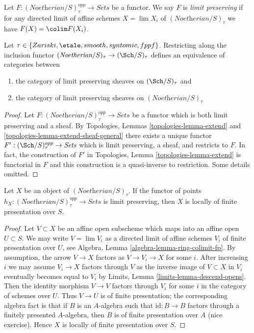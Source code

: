 \noindent
Let $F : (\textit{Noetherian}/S)_\tau^{opp} \to \textit{Sets}$
be a functor. We say $F$ is {\it limit preserving} if for any
directed limit of affine schemes $X = \lim X_i$ of
$(\textit{Noetherian}/S)_\tau$ we have $F(X) = \colim F(X_i)$.

\begin{lemma}
\label{lemma-canonical-extension}
Let $\tau \in \{Zariski, \etale, smooth, syntomic, fppf\}$.
Restricting along the inclusion functor
$(\textit{Noetherian}/S)_\tau \to (\Sch/S)_\tau$
defines an equivalence of categories between
\begin{enumerate}
\item the category of limit preserving sheaves on
$(\Sch/S)_\tau$ and
\item the category of limit preserving sheaves on
$(\textit{Noetherian}/S)_\tau$
\end{enumerate}
\end{lemma}

\begin{proof}
Let $F : (\textit{Noetherian}/S)_\tau^{opp} \to \textit{Sets}$
be a functor which is both limit preserving and a sheaf.
By Topologies, Lemmas
\ref{topologies-lemma-extend} and \ref{topologies-lemma-extend-sheaf-general}
there exists a unique functor
$F' : (\Sch/S)_\tau^{opp} \to \textit{Sets}$
which is limit preserving, a sheaf, and restricts to $F$.
In fact, the construction of $F'$ in
Topologies, Lemma \ref{topologies-lemma-extend}
is functorial in $F$ and this construction is a quasi-inverse
to restriction. Some details omitted.
\end{proof}

\begin{lemma}
\label{lemma-representable-limit-preserving}
Let $X$ be an object of $(\textit{Noetherian}/S)_\tau$. If the functor
of points $h_X : (\textit{Noetherian}/S)_\tau^{opp} \to \textit{Sets}$
is limit preserving, then $X$ is locally of finite presentation over $S$.
\end{lemma}

\begin{proof}
Let $V \subset X$ be an affine open subscheme which maps into an affine
open $U \subset S$. We may write $V = \lim V_i$ as a directed limit of affine
schemes $V_i$ of finite presentation over $U$, see
Algebra, Lemma \ref{algebra-lemma-ring-colimit-fp}.
By assumption, the arrow $V \to X$ factors as $V \to V_i \to X$
for some $i$. After increasing $i$ we may assume $V_i \to X$
factors through $V$ as the inverse image of $V \subset X$ in $V_i$
eventually becomes equal to $V_i$ by
Limits, Lemma \ref{limits-lemma-descend-opens}.
Then the identity morphism $V \to V$ factors through $V_i$ for some $i$
in the category of schemes over $U$. Thus $V \to U$ is of finite presentation;
the corresponding algebra fact is that if $B$ is an $A$-algebra
such that $\text{id} : B \to B$ factors through a finitely presented
$A$-algebra, then $B$ is of finite presentation over $A$ (nice exercise).
Hence $X$ is locally of finite presentation over $S$.
\end{proof}

